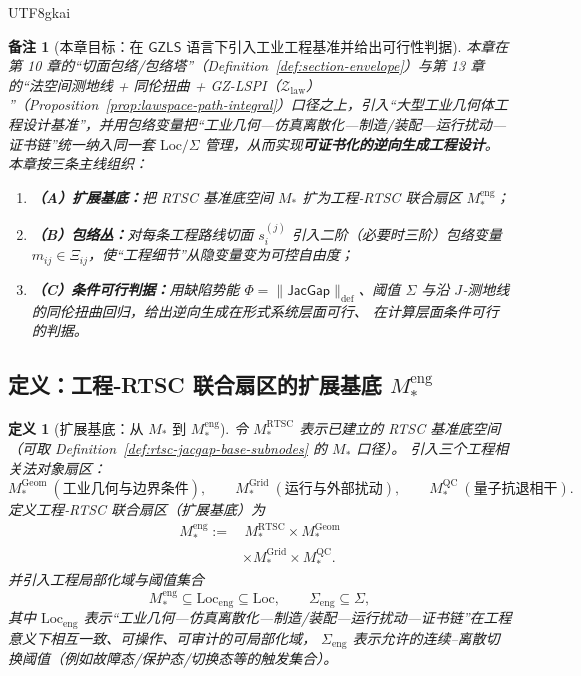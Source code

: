 \documentclass[12pt]{article}
\newtheorem{definition}{定义}[section]
\newtheorem{remark}{备注}[section]
\newcommand{\GZLS}{\ensuremath{\mathsf{GZLS}}}
\newcommand{\JacGap}{\ensuremath{\mathsf{JacGap}}}
\newcommand{\RTSC}{\textsf{RTSC}}
\begin{document}
\begin{CJK*}{UTF8}{gkai}
\begin{remark}[本章目标：在 $\GZLS$ 语言下引入工业工程基准并给出可行性判据]
本章在第 10 章的“切面包络/包络塔”（Definition~\ref{def:section-envelope}）与第 13 章的“法空间测地线 + 同伦扭曲 + GZ-LSPI（$\mathcal{Z}_{\mathrm{law}}$）
  ”（Proposition~\ref{prop:lawspace-path-integral}）口径之上，引入“大型工业几何体工程设计基准”，并用包络变量把“工业几何—仿真离散化—制造/装配—运行扰动—证书链”统一纳入同一套
  $\mathrm{Loc}/\Sigma$ 管理，从而实现\textbf{可证书化的逆向生成工程设计}。
本章按三条主线组织：
\begin{enumerate}
  \item \textbf{（A）扩展基底：}把 RTSC 基准底空间 $M_\ast$ 扩为工程‑RTSC 联合扇区 $M_\ast^{\mathrm{eng}}$；
  \item \textbf{（B）包络丛：}对每条工程路线切面 $s_i^{(j)}$ 引入二阶（必要时三阶）包络变量 $m_{ij}\in\Xi_{ij}$，使“工程细节”从隐变量变为可控自由度；
  \item \textbf{（C）条件可行判据：}用缺陷势能 $\Phi=\|\JacGap\|_{\mathrm{def}}$、阈值 $\Sigma$ 与沿 $J$‑测地线的同伦扭曲回归，给出逆向生成在形式系统层面可行、
    在计算层面条件可行的判据。
\end{enumerate}
\end{remark}

\subsection{定义：工程‑RTSC 联合扇区的扩展基底 $M_\ast^{\mathrm{eng}}$}

\begin{definition}[扩展基底：从 $M_\ast$ 到 $M_\ast^{\mathrm{eng}}$]
\label{def:eng-extended-base}
令 $M_\ast^{\mathrm{RTSC}}$ 表示已建立的 \RTSC{} 基准底空间（可取 Definition~\ref{def:rtsc-jacgap-base-subnodes} 的 $M_\ast$ 口径）。
引入三个工程相关法对象扇区：
\[
M_\ast^{\mathrm{Geom}}\ (\text{工业几何与边界条件}),
\qquad
M_\ast^{\mathrm{Grid}}\ (\text{运行与外部扰动}),
\qquad
M_\ast^{\mathrm{QC}}\ (\text{量子抗退相干}).
\]
定义工程‑RTSC 联合扇区（扩展基底）为
\[
\begin{aligned}
M_\ast^{\mathrm{eng}}
:=
&\,M_\ast^{\mathrm{RTSC}}
\times
M_\ast^{\mathrm{Geom}}
\\
&\times
M_\ast^{\mathrm{Grid}}
\times
M_\ast^{\mathrm{QC}}.
\end{aligned}
\]
并引入工程局部化域与阈值集合
\[
M_\ast^{\mathrm{eng}}\subseteq \mathrm{Loc}_{\mathrm{eng}}\subseteq \mathrm{Loc},
\qquad
\Sigma_{\mathrm{eng}}\subseteq \Sigma,
\]
其中 $\mathrm{Loc}_{\mathrm{eng}}$ 表示“工业几何—仿真离散化—制造/装配—运行扰动—证书链”在工程意义下相互一致、可操作、可审计的可局部化域，
$\Sigma_{\mathrm{eng}}$ 表示允许的连续–离散切换阈值（例如故障态/保护态/切换态等的触发集合）。
\end{definition}


\end{CJK*}
\end{document}
